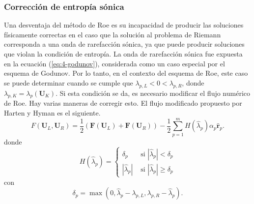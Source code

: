 \subsubsection{Corrección de entropía sónica}
Una desventaja del método de Roe es su incapacidad de producir las soluciones físicamente correctas en el caso que la solución al problema de Riemann corresponda a una onda de rarefacción sónica, ya que puede producir soluciones que violan la condición de entropía. La onda de rarefacción sónica fue expuesta en la ecuación (\ref{eq:4-godunov}), considerada como un caso especial por el esquema de Godunov. Por lo tanto, en el contexto del esquema de Roe, este caso se puede determinar cuando se cumple que $\lambda_{p,L} < 0 < \lambda_{p,R}$, donde $\lambda_{p,K} = \lambda_{p}(\mathbf{{U}}_K)$. Si esta condición se da, es necesario modificar el flujo numérico de Roe. Hay varias maneras de corregir esto. El flujo modificado propuesto por Harten y Hyman
\cite{pelanti}
 es el siguiente.
\begin{equation}
	F(\mathbf{U}_L, \mathbf{U}_R) = \frac{1}{2}\left(\mathbf{F}(\mathbf{U}_L) +\mathbf{F}(\mathbf{U}_R)\right) - 
	\frac{1}{2}\sum_{p=1}^{m}H(\hat{\lambda}_{p})\alpha_{p}\mathbf{\hat{r}}_{p}.
	\label{eq:flux-HH-fix}
\end{equation}
donde
\begin{equation}
	H(\hat{\lambda}_{p})=
	\begin{cases}
		\delta_{p} & \text{ si } |\hat{\lambda}_p| < \delta_{p}\\
		|\hat{\lambda}_p| & \text{ si } |\hat{\lambda}_p| \geq \delta_{p}
	\end{cases}
\label{eq:HH-fix}
\end{equation}
con
\begin{equation}
	\delta_{p} = \max(0, \hat{\lambda}_p - \lambda_{p,L}, \lambda_{p,R}- \hat{\lambda}_p).
\end{equation}